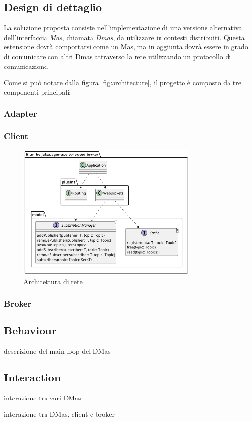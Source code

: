 \subsection{Design di dettaglio}
La soluzione proposta consiste nell'implementazione di una versione alternativa dell'interfaccia \textit{Mas}, chiamata \textit{Dmas}, da utilizzare in contesti distribuiti.
Questa estensione dovrà comportarsi come un Mas, ma in aggiunta dovrà essere in grado di comunicare con altri Dmas attraverso la rete utilizzando un protocollo di comunicazione.

Come si può notare dalla figura \ref{fig:architecture}, il progetto è composto da tre componenti principali:

\subsubsection{Adapter}

\subsubsection{Client}

\begin{figure}
    \centering
    \includegraphics[width=0.8\textwidth]{figures/broker-class-diagram.png}
    \caption{Architettura di rete}
    \label{fig:broker-class-diagram}
\end{figure}

\subsubsection{Broker}


\subsection{Behaviour}

descrizione del main loop del DMas

\subsection{Interaction}

interazione tra vari DMas

interazione tra DMas, client e broker
